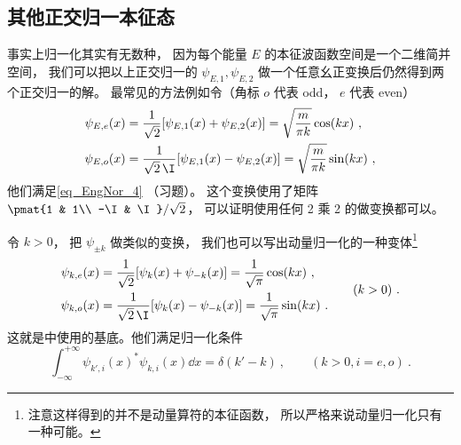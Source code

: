 \subsection{其他正交归一本征态}
事实上归一化其实有无数种， 因为每个能量 $E$ 的本征波函数空间是一个二维简并空间， 我们可以把以上正交归一的 $\psi_{E,1}, \psi_{E,2}$ 做一个任意幺正变换后仍然得到两个正交归一的解。 最常见的方法例如令（角标 $o$ 代表 odd， $e$ 代表 even）
\begin{equation}
\begin{aligned}
\psi_{E,e}(x) &= \frac{1}{\sqrt{2}}[\psi_{E,1}(x) + \psi_{E,2}(x)] = \sqrt{\frac{m}{\pi k}}\cos(kx)~,\\
\psi_{E,o}(x) &= \frac{1}{\sqrt{2}\,\I}[\psi_{E,1}(x) - \psi_{E,2}(x)] = \sqrt{\frac{m}{\pi k}}\sin(kx)~,
\end{aligned}
\end{equation}
他们满足\autoref{eq_EngNor_4} （习题）。 这个变换使用了矩阵 $\pmat{1 & 1\\ -\I & \I}/\sqrt{2}$， 可以证明使用任何 2 乘 2 的做变换都可以。

令 $k > 0$， 把 $\psi_{\pm k}$ 做类似的变换， 我们也可以写出动量归一化的一种变体\footnote{注意这样得到的并不是动量算符的本征函数， 所以严格来说动量归一化只有一种可能。}
\begin{equation}\label{eq_EngNor_5}
\begin{aligned}
\psi_{k,e}(x) &= \frac{1}{\sqrt{2}}[\psi_{k}(x) + \psi_{-k}(x)] = \frac{1}{\sqrt{\pi}}\cos(kx)~,\\
\psi_{k,o}(x) &= \frac{1}{\sqrt{2}\,\I}[\psi_{k}(x) - \psi_{-k}(x)] = \frac{1}{\sqrt{\pi}}\sin(kx)~.
\end{aligned}
\qquad (k > 0)~.
\end{equation}
这就是中使用的基底。他们满足归一化条件
\begin{equation}\label{eq_EngNor_3}
\int_{-\infty}^{+\infty} \psi_{k',i}(x)^* \psi_{k,i}(x) \dd{x} = \delta(k' - k) ~,\qquad (k > 0, i = e, o)~.
\end{equation}
